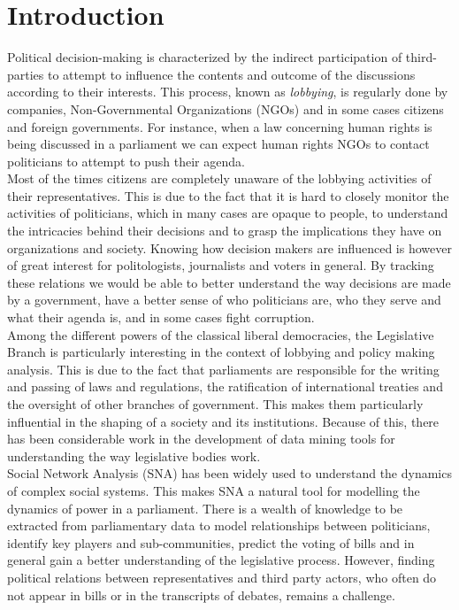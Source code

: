 \section{Introduction}\label{sec:intro}

Political decision-making is characterized by the indirect participation of third-parties to attempt to influence the contents and outcome of the discussions according to their interests. This process, known as \emph{lobbying}, is regularly done by companies, Non-Governmental Organizations (NGOs) and in some cases citizens and foreign governments. For instance, when a law concerning human rights is being discussed in a parliament we can expect human rights NGOs to contact politicians to attempt to push their agenda. \\

Most of the times citizens are completely unaware of the lobbying activities of their representatives. This is due to the fact that it is hard to closely monitor the activities of politicians, which in many cases are opaque to people, to understand the intricacies behind their decisions and to grasp the implications they have on organizations and society. Knowing how decision makers are influenced is however of great interest for politologists, journalists and voters in general. By tracking these relations we would be able to better understand the way decisions are made by a government, have a better sense of who politicians are, who they serve and what their agenda is, and in some cases fight corruption. \\

Among the different powers of the classical liberal democracies, the Legislative Branch is particularly interesting in the context of lobbying and policy making analysis. This is due to the fact that parliaments are responsible for the writing and passing of laws and regulations, the ratification of international treaties and the oversight of other branches of government. This makes them particularly influential in the shaping of a society and its institutions. Because of this, there has been considerable work in the development of data mining tools for understanding the way legislative bodies work.\\ 

Social Network Analysis (SNA) has been widely used to understand the dynamics of complex social systems. This makes SNA a natural tool for modelling the dynamics of power in a parliament. There is a wealth of knowledge to be extracted from parliamentary data to model relationships between politicians, identify key players and sub-communities, predict the voting of bills and in general gain a better understanding of the legislative process. However, finding political relations between representatives and third party actors, who often do not appear in bills or in the transcripts of debates, remains a challenge. \\

